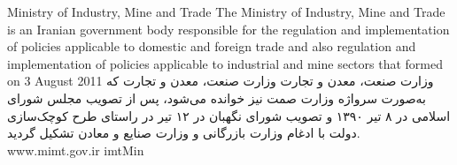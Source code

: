 
\instituteC
{Ministry of Industry, Mine and Trade}
{The Ministry of Industry, Mine and Trade is an Iranian government body responsible for the regulation and implementation of
policies applicable to domestic and foreign trade and also regulation and implementation of policies applicable to industrial
and mine sectors that formed on 3 August 2011}
{}
{وزارت صنعت، معدن و تجارت}
{وزارت صنعت، معدن و تجارت که به‌صورت سرواژه وزارت صمت نیز خوانده می‌شود،
پس از تصویب مجلس شورای اسلامی در ۸ تیر ۱۳۹۰ و تصویب شورای نگهبان در ۱۲ تیر
در راستای طرح کوچک‌سازی دولت با ادغام وزارت بازرگانی و وزارت صنایع و معادن تشکیل گردید.}
{}
{www.mimt.gov.ir}
{imtMin}
